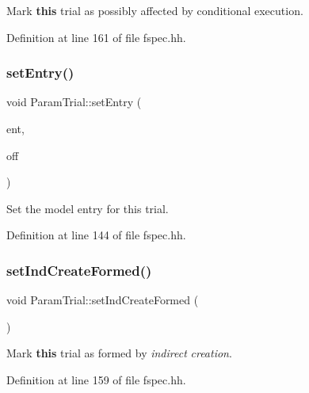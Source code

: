 Mark {\bfseries{this}} trial as possibly affected by conditional execution. 



Definition at line 161 of file fspec.\+hh.

\mbox{\label{class_param_trial_aed34fdf0eec82c9a56fc7ff105bad618}} 
\subsubsection{\texorpdfstring{setEntry()}{setEntry()}}
{\footnotesize\ttfamily void Param\+Trial\+::set\+Entry (\begin{DoxyParamCaption}\item[{const \mbox{\hyperlink{class_param_entry}{Param\+Entry}} $\ast$}]{ent,  }\item[{int4}]{off }\end{DoxyParamCaption})\hspace{0.3cm}{\ttfamily [inline]}}



Set the model entry for this trial. 



Definition at line 144 of file fspec.\+hh.

\mbox{\label{class_param_trial_a6a4ace8cab74a380e92b62505c70046a}} 
\subsubsection{\texorpdfstring{setIndCreateFormed()}{setIndCreateFormed()}}
{\footnotesize\ttfamily void Param\+Trial\+::set\+Ind\+Create\+Formed (\begin{DoxyParamCaption}\item[{void}]{ }\end{DoxyParamCaption})\hspace{0.3cm}{\ttfamily [inline]}}



Mark {\bfseries{this}} trial as formed by {\itshape indirect} {\itshape creation}. 



Definition at line 159 of file fspec.\+hh.

